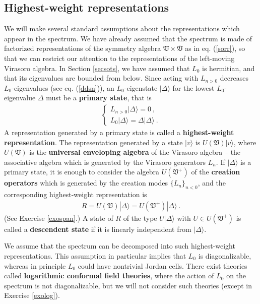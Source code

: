 \documentclass[12pt,a4paper,notitlepage]{report}
\newcommand \bla {\left\{\begin{array}{l} }
\newcommand \ela {\end{array}\right. }
\numberwithin{equation}{section}
\theoremstyle{break}
\begin{document}
\subsection{Highest-weight representations}

We will make several standard assumptions about the representations which appear in the spectrum. We have already assumed that the spectrum is made of factorized representations of the symmetry algebra $\mathfrak{V}\times \overline{\mathfrak{V}}$ as in eq. (\ref{sorr}), so that we can restrict our attention to the representations of the left-moving Virasoro algebra. In Section \ref{secsots}, we have assumed that $L_0$ is hermitian, and that its eigenvalues are bounded from below. Since acting with $L_{n>0}$ decreases $L_0$-eigenvalues (see eq. (\ref{ddsn})), an $L_0$-eigenstate $|\Delta\rangle$ for the lowest $L_0$-eigenvalue $\Delta$ must be a \textbf{\boldmath primary state}, that is
\begin{align}
 \boxed{\bla L_{n>0}|\Delta\rangle = 0\ , \\ L_0 |\Delta\rangle = \Delta |\Delta\rangle\ .\ela}
\label{lvlv}
\end{align}
A representation generated by a primary state is called a \textbf{\boldmath highest-weight representation}. The representation generated by a state $|v\rangle$ is $U(\mathfrak{V})|v\rangle$, where $U(\mathfrak{V})$ is the \textbf{\boldmath universal enveloping algebra} of the Virasoro algebra -- the associative algebra which is generated by the Virasoro generators $L_n$. If $|\Delta\rangle$ is a primary state, it is enough to consider the algebra $U(\mathfrak{V}^+)$ of the \textbf{\boldmath creation operators} which is generated by the creation modes $\{L_n\}_{n<0}$, and the corresponding highest-weight representation is 
\begin{align}
 R = U(\mathfrak{V})|\Delta\rangle =U(\mathfrak{V}^+)|\Delta\rangle\ .
\label{ruv}
\end{align}
(See Exercise \ref{exospan}.)
A state of $R$ of the type $U|\Delta\rangle$ with $U\in U(\mathfrak{V}^+)$ is called a \textbf{\boldmath descendent state} if it is linearly independent from $|\Delta\rangle$.

We assume that the spectrum can be decomposed into such highest-weight representations. This assumption in particular implies that $L_0$ is diagonalizable, whereas in principle $L_0$ could have nontrivial Jordan cells. There exist theories called \textbf{\boldmath logarithmic conformal field theories}, where the action of $L_0$ on the spectrum is not diagonalizable, but we will not consider such theories (except in Exercise \ref{exolog}).
\end{document}
